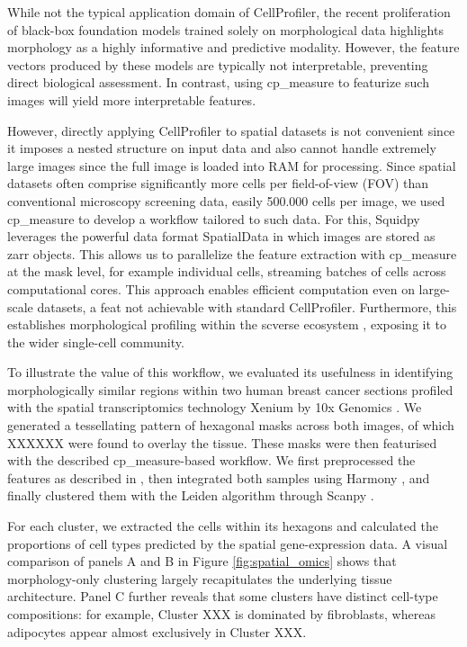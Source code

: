 \documentclass{article}
\begin{document}
While not the typical application domain of CellProfiler, the recent proliferation of black-box foundation models trained solely on morphological data \citep{Chen2024-ix, Xu2024-mn} highlights morphology as a highly informative and predictive modality. However, the feature vectors produced by these models are typically not interpretable, preventing direct biological assessment. In contrast, using cp\_measure to featurize such images will yield more interpretable features.

However, directly applying CellProfiler to spatial datasets is not convenient since it imposes a nested structure on input data and also cannot handle extremely large images since the full image is loaded into RAM for processing. Since spatial datasets often comprise significantly more cells per field-of-view (FOV) than conventional microscopy screening data, easily 500.000 cells per image, we used cp\_measure to develop a workflow tailored to such data. For this, Squidpy leverages the powerful data format SpatialData \citep{Marconato2024-SpatialData} in which images are stored as zarr objects. This allows us to parallelize the feature extraction with cp\_measure at the mask level, for example individual cells, streaming batches of cells across computational cores. This approach enables efficient computation even on large-scale datasets, a feat not achievable with standard CellProfiler. Furthermore, this establishes morphological profiling within the scverse ecosystem \citep{Virshup2023-scverse}, exposing it to the wider single-cell community.

To illustrate the value of this workflow, we evaluated its usefulness in identifying morphologically similar regions within two human breast cancer sections profiled with the spatial transcriptomics technology Xenium by 10x Genomics \citep{10x-Genomics2023-el}. We generated a tessellating pattern of hexagonal masks across both images, of which XXXXXX were found to overlay the tissue. These masks were then featurised with the described cp\_measure-based workflow. We first preprocessed the features as described in 
\citep{serranoReproducibleImagebasedProfiling2025}, then integrated both samples using Harmony \citep{Korsunsky2019-Harmony}, and finally clustered them with the Leiden algorithm through Scanpy \citep{wolfSCANPYLargescaleSinglecell2018}. 

For each cluster, we extracted the cells within its hexagons and calculated the proportions of cell types predicted by the spatial gene-expression data. A visual comparison of panels A and B in Figure \ref{fig:spatial_omics} shows that morphology-only clustering largely recapitulates the underlying tissue architecture. Panel C further reveals that some clusters have distinct cell-type compositions: for example, Cluster XXX is dominated by fibroblasts, whereas adipocytes appear almost exclusively in Cluster XXX.
\end{document}
